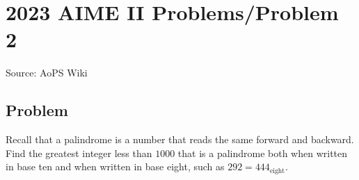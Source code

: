 \documentclass[12pt]{article}
\begin{document}
\section*{{2023 AIME II Problems/Problem 2}}
Source: AoPS Wiki

\subsection*{Problem}
Recall that a palindrome is a number that reads the same forward and backward. Find the greatest integer less than $1000$ that is a palindrome both when written in base ten and when written in base eight, such as $292 = 444_{\text{eight}}.$
\end{document}
